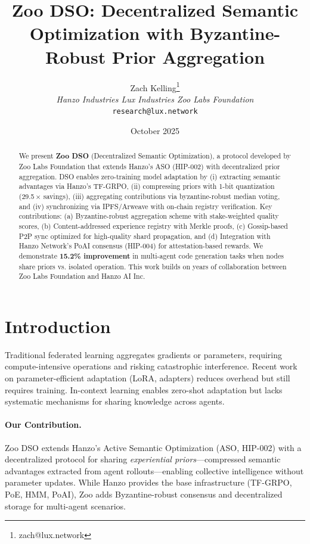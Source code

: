 \documentclass[11pt]{article}
\title{Zoo DSO: Decentralized Semantic Optimization with Byzantine-Robust Prior Aggregation}
\author{Zach Kelling\thanks{zach@lux.network} \\ \textit{Hanzo Industries \quad Lux Industries \quad Zoo Labs Foundation} \\ \texttt{research@lux.network}}
\date{October 2025}
\begin{document}
\maketitle
\zoocover

\begin{abstract}
We present \textbf{Zoo DSO} (Decentralized Semantic Optimization), a protocol developed by Zoo Labs Foundation that extends Hanzo's ASO (HIP-002) with decentralized prior aggregation. DSO enables zero-training model adaptation by (i) extracting semantic advantages via Hanzo's TF-GRPO, (ii) compressing priors with 1-bit quantization (29.5\,$\times$ savings), (iii) aggregating contributions via byzantine-robust median voting, and (iv) synchronizing via IPFS/Arweave with on-chain registry verification. Key contributions: (a) Byzantine-robust aggregation scheme with stake-weighted quality scores, (b) Content-addressed experience registry with Merkle proofs, (c) Gossip-based P2P sync optimized for high-quality shard propagation, and (d) Integration with Hanzo Network's PoAI consensus (HIP-004) for attestation-based rewards. We demonstrate \textbf{15.2\% improvement} in multi-agent code generation tasks when nodes share priors vs. isolated operation. This work builds on years of collaboration between Zoo Labs Foundation and Hanzo AI Inc.
\end{abstract}

\section{Introduction}
Traditional federated learning aggregates gradients or parameters, requiring compute-intensive operations and risking catastrophic interference. Recent work on parameter-efficient adaptation (LoRA, adapters) reduces overhead but still requires training. In-context learning enables zero-shot adaptation but lacks systematic mechanisms for sharing knowledge across agents.

\paragraph{Our Contribution.} Zoo DSO extends Hanzo's Active Semantic Optimization (ASO, HIP-002) with a decentralized protocol for sharing \emph{experiential priors}---compressed semantic advantages extracted from agent rollouts---enabling collective intelligence without parameter updates. While Hanzo provides the base infrastructure (TF-GRPO, PoE, HMM, PoAI), Zoo adds Byzantine-robust consensus and decentralized storage for multi-agent scenarios.
\end{document}
